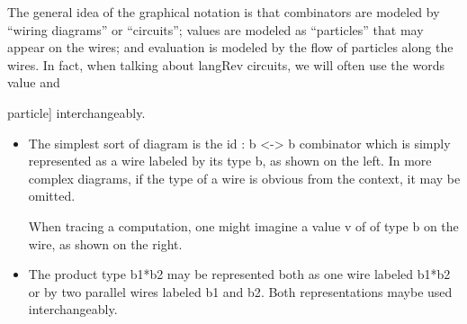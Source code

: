 \documentclass[preprint]{sigplanconf}
\begin{document}
The general idea of the graphical notation is that combinators are
modeled by ``wiring diagrams'' or ``circuits''; values are modeled as
``particles'' that may appear on the wires; and evaluation is modeled
by the flow of particles along the wires. In fact, when talking about
{{langRev}} circuits, we will often use the words {{value}} and
{{particle}] interchangeably.


\begin{itemize}
\item The simplest sort of diagram is the {{id : b <-> b}} combinator
  which is simply represented as a wire labeled by its type {{b}}, as
  shown on the left. In more complex diagrams, if the type of a wire
  is obvious from the context, it may be omitted.

  \begin{multicols}{2}
\begin{center}
\end{center}


\begin{center}
\end{center}
  \end{multicols}

When tracing a computation, one might imagine a value {{v}} of of type
{{b}} on the wire, as shown on the right.

\item The product type {{b1*b2}} may be represented both as one wire labeled
  {{b1*b2}} or by two parallel wires labeled {{b1}} and {{b2}}. Both
  representations maybe used interchangeably.
\begin{multicols}{2}
\begin{center}
\end{center}
\begin{center}
\end{center}
\end{multicols}


\end{itemize}}
\end{document}
